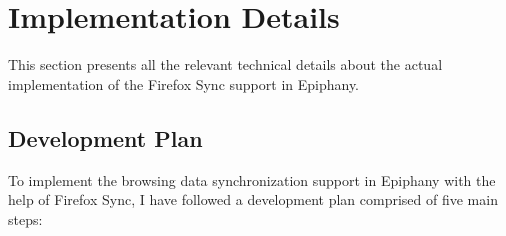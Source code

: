 \section{Implementation Details}
\label{sec:implementation-details}

This section presents all the relevant technical details about the actual implementation of the Firefox Sync support in Epiphany.

\subsection{Development Plan}
\label{sub-sec:development-plan}

To implement the browsing data synchronization support in Epiphany with the help of Firefox Sync, I have followed a development plan comprised of five main steps:

